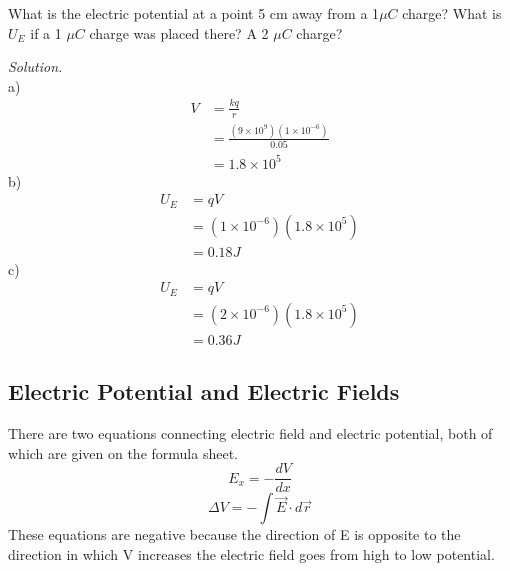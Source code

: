 \documentclass[12pt, titlepage]{article}
\begin{document}
\begin{Problem}
    What is the electric potential at a point 5 cm away from a 1$\mu C$ charge? What is $U_E$ if a 1 $\mu C$ charge was placed there? A 2 $\mu C$ charge?

    \tcblower
    \textit{Solution. \\}
    a)
    \begin{equation*}
        \begin{split}
        V&=\frac{kq}{r} \\
        &=\frac{(9 \times 10^{9})(1 \times 10^{-6})}{0.05} \\
        &=1.8 \times 10^{5}
        \end{split}
    \end{equation*}
    b)
    \begin{equation*}
        \begin{split}
        U_E &= qV \\
        &= (1 \times 10^{-6})(1.8 \times 10^{5}) \\
        &= 0.18J
        \end{split}
    \end{equation*}
    c) 
    \begin{equation*}
        \begin{split}
        U_E &= qV \\
        &= (2 \times 10^{-6})(1.8 \times 10^{5}) \\
        &= 0.36J
        \end{split}
    \end{equation*}
\end{Problem}
\subsection*{Electric Potential and Electric Fields}
There are two equations connecting electric field and electric potential, both of which are given on the formula sheet.
\begin{equation*}
    E_x = -\frac{dV}{dx}
\end{equation*}
\begin{equation*}
    \Delta V = - \int \vec{E} \cdot d\vec{r}
\end{equation*}
These equations are negative because the direction of E is opposite to the direction in which V increases \textemdash{} the electric field goes from high to low potential. 
\end{document}
